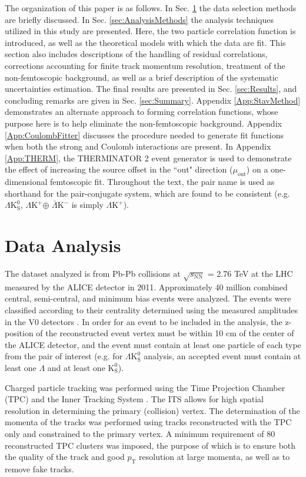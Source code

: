 \documentclass[ALICE,manyauthors]{cernphprep}
\newcommand{\pt}{$p_{\mathrm{T}}$\xspace}
\newcommand{\Lam}{$\Lambda$\xspace}
\newcommand{\Ks}{$\mathrm{K^{0}_{S}}$\xspace}
\newcommand{\LamKchP}{$\Lambda\mathrm{K^{+}}$\xspace}
\newcommand{\ALamKchM}{$\bar{\Lambda}\mathrm{K^{-}}$\xspace}
\newcommand{\LamKs}{$\Lambda\mathrm{K^{0}_{S}}$\xspace}
\begin{document}
The organization of this paper is as follows.  
In Sec. \ref{sec:DataAnalysis} the data selection methods are briefly discussed.
In Sec. \ref{sec:AnalysisMethods} the analysis techniques utilized in this study are presented.  
Here, the two particle correlation function is introduced, as well as the theoretical models with which the data are fit.  
This section also includes descriptions of the handling of residual correlations, corrections accounting for finite track momentum resolution, treatment of the non-femtoscopic background, as well as a brief description of the systematic uncertainties estimation.  
The final results are presented in Sec. \ref{sec:Results}, and concluding remarks are given in Sec. \ref{sec:Summary}.
Appendix \ref{App:StavMethod} demonstrates an alternate approach to forming correlation functions, whose purpose here is to help eliminate the non-femtoscopic background.
Appendix \ref{App:CoulombFitter} discusses the procedure needed to generate fit functions when both the strong and Coulomb interactions are present.
In Appendix \ref{App:THERM}, the THERMINATOR 2 event generator is used to demonstrate the effect of increasing the source offset in the ``out" direction ($\mu_{\mathrm{out}}$) on a one-dimensional femtoscopic fit.
Throughout the text, the pair name is used as shorthand for the pair-conjugate system, which are found to be consistent (e.g. \LamKs, \LamKchP $\oplus$ \ALamKchM is simply \LamKchP).

\section{Data Analysis}
\label{sec:DataAnalysis}

The dataset analyzed is from Pb-Pb collisions at $\sqrt{s_{\mathrm{NN}}}$ = 2.76 TeV at the LHC measured by the ALICE detector \cite{1748-0221-3-08-S08002} in 2011.
Approximately 40 million combined central, semi-central, and minimum bias events were analyzed.
The events were classified according to their centrality determined using the measured amplitudes in the V0 detectors \cite{Abelev:2013qoq}.  
In order for an event to be included in the analysis, the z-position of the reconstructed event vertex must be within 10 cm of the center of the ALICE detector, and the event must contain at least one particle of each type from the pair of interest (e.g. for \LamKs analysis, an accepted event must contain at least one \Lam and at least one \Ks). 

Charged particle tracking was performed using the Time Projection Chamber (TPC) \cite{2010NIMPA.622..316A} and the Inner Tracking System \cite{0954-3899-41-8-087002}.  
The ITS allows for high spatial resolution in determining the primary (collision) vertex.
The determination of the momenta of the tracks was performed using tracks reconstructed with the TPC only and constrained to the primary vertex.
A minimum requirement of 80 reconstructed TPC clusters was imposed, the purpose of which is to ensure both the quality of the track and good \pt resolution at large momenta, as well as to remove fake tracks.
\end{document}

